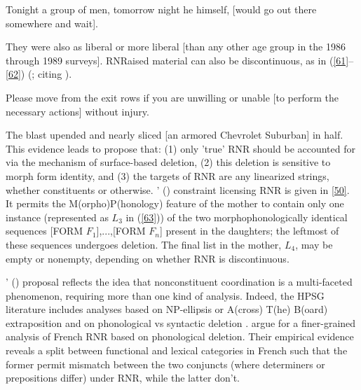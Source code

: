 \documentclass[output=paper
                ,modfonts
                ,nonflat
	        ,collection
	        ,collectionchapter
	        ,collectiontoclongg
 	        ,biblatex
                ,babelshorthands
                ,newtxmath
                ,draftmode
                ,colorlinks, citecolor=brown
]{./langsci/langscibook}
\begin{document}
{\ea Tonight a group of men, tomorrow night he himself, [would go out there somewhere and wait].\label{59}\z

\ea They were also as liberal or more liberal [than any other age group in the 1986 through 1989 surveys].\label{60}\z
RNRaised material can also be discontinuous, as in (\ref{61}--\ref{62}) (\citealt[868]{Chaves2014}; citing \citealt[238--240]{Whitman2009}). 

\ea Please move from the exit rows if you are unwilling or unable [to perform the necessary actions] without injury.\label{61}\z

\ea The blast upended and nearly sliced [an armored Chevrolet Suburban] in half.\label{62}\z
This evidence leads \citet{Chaves2014} to propose that: (1) only 'true' RNR should be accounted for via the mechanism of surface-based deletion, (2) this deletion is sensitive to morph form identity, and (3) the targets of RNR are any linearized strings, whether constituents or otherwise. \citeauthor{Chaves2014}' (\citeyear[874]{Chaves2014}) constraint licensing RNR is given in \ref{50}. It permits the M(orpho)P(honology) feature of the mother to contain only one instance (represented as $L_{3}$ in (\ref{63})) of the two morphophonologically identical sequences [FORM $F_{1}$],...,[FORM $F_{n}$] present in the daughters; the leftmost of these sequences undergoes deletion. The final list in the mother, $L_{4}$, may be empty or nonempty, depending on whether RNR is discontinuous.


\z



\citeauthor{Chaves2014}' (\citeyear{Chaves2014}) proposal reflects the idea that nonconstituent coordination is a multi-faceted phenomenon, requiring more than one kind of analysis. Indeed, the HPSG literature includes analyses based on NP-ellipsis or A(cross) T(he) B(oard) extraposition \citep{Chaves2014} and on phonological vs syntactic deletion \citep{Yatabe2001, Yatabe2012, Yatabe2018}. \citet{Abeille2016} argue for a finer-grained analysis of French RNR based on phonological deletion. Their empirical evidence reveals a split between functional and lexical categories in French such that the former permit mismatch between the two conjuncts (where determiners or prepositions differ) under RNR, while the latter don't.



}
\end{document}
